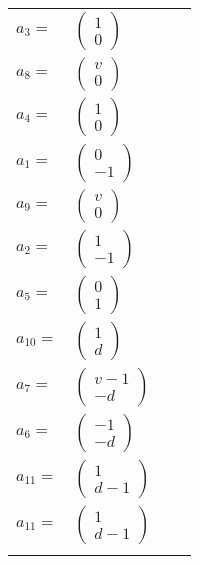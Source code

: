 \documentclass[1p]{elsarticle_modified}
\theoremstyle{definition}
\begin{document}
\begin{tabular}{m{7pt} m{180pt} m{7pt} m{180pt} }
\flushright $a_{3}=$&$\begin{pmatrix}1\\0\end{pmatrix}$ \\
\flushright $a_{8}=$&$\begin{pmatrix}v\\0\end{pmatrix}$ \\
\flushright $a_{4}=$&$\begin{pmatrix}1\\0\end{pmatrix}$ \\
\flushright $a_{1}=$&$\begin{pmatrix}0\\-1\end{pmatrix}$ \\
\flushright $a_{9}=$&$\begin{pmatrix}v\\0\end{pmatrix}$ \\
\flushright $a_{2}=$&$\begin{pmatrix}1\\-1\end{pmatrix}$ \\
\flushright $a_{5}=$&$\begin{pmatrix}0\\1\end{pmatrix}$ \\
\flushright $a_{10}=$&$\begin{pmatrix}1\\d\end{pmatrix}$ \\
\flushright $a_{7}=$&$\begin{pmatrix}v-1\\- d\end{pmatrix}$ \\
\flushright $a_{6}=$&$\begin{pmatrix}-1\\- d\end{pmatrix}$ \\
\flushright $a_{11}=$&$\begin{pmatrix}1\\d-1\end{pmatrix}$\\ \flushright $a_{11}=$&$\begin{pmatrix}1\\d-1\end{pmatrix}$\\&\end{tabular}
\end{document}
